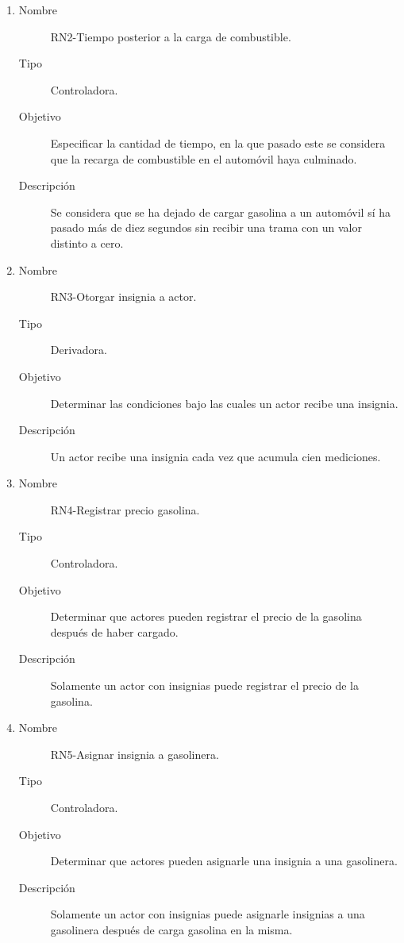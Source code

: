 \begin{enumerate}[label=RN\arabic*.]
	\item \label{RN2}
		\begin{description}
			\item[Nombre] RN2-Tiempo posterior a la carga de combustible.
			\item[Tipo] Controladora.
			\item[Objetivo] Especificar la cantidad de tiempo, en la que pasado este se considera que la recarga de combustible en el automóvil haya culminado.
			\item[Descripción] Se considera que se ha dejado de cargar gasolina a un automóvil sí ha pasado más de diez segundos sin recibir una trama con un valor distinto a cero.
		\end{description}
	\item \label{RN3}
		\begin{description}
			\item[Nombre] RN3-Otorgar insignia a actor.
			\item[Tipo] Derivadora.
			\item[Objetivo] Determinar las condiciones bajo las cuales un actor recibe una insignia.
			\item[Descripción] Un actor recibe una insignia cada vez que acumula cien mediciones.
		\end{description}
	\item \label{RN4}
		\begin{description}
			\item[Nombre] RN4-Registrar precio gasolina.
			\item[Tipo] Controladora.
			\item[Objetivo] Determinar que actores pueden registrar el precio de la gasolina después de haber cargado.
			\item[Descripción] Solamente un actor con insignias puede registrar el precio de la gasolina.
		\end{description}
	\item \label{RN5}
		\begin{description}
			\item[Nombre] RN5-Asignar insignia a gasolinera.
			\item[Tipo] Controladora.
			\item[Objetivo] Determinar que actores pueden asignarle una insignia a una gasolinera.
			\item[Descripción] Solamente un actor con insignias puede asignarle insignias a una gasolinera después de carga gasolina en la misma.

\end{description}
\end{enumerate}
